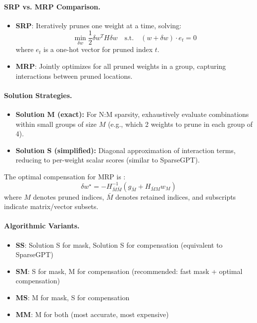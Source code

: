\paragraph{SRP vs. MRP Comparison.}
\begin{itemize}
	\item \textbf{SRP}: Iteratively prunes one weight at a time, solving:
	\begin{equation}\label{eq:srp}
		\min_{\delta w} \frac{1}{2}\delta w^T H \delta w \quad\text{s.t.}\quad (w+\delta w)\cdot e_t = 0
	\end{equation}
	where $e_t$ is a one-hot vector for pruned index $t$.
	
	\item \textbf{MRP}: Jointly optimizes for all pruned weights in a group, capturing interactions between pruned locations.
\end{itemize}

\paragraph{Solution Strategies.}
\begin{itemize}
	\item \textbf{Solution M (exact):} For N:M sparsity, exhaustively evaluate combinations within small groups of size $M$ (e.g., which 2 weights to prune in each group of 4).
	\item \textbf{Solution S (simplified):} Diagonal approximation of interaction terms, reducing to per-weight scalar scores (similar to SparseGPT).
\end{itemize}

The optimal compensation for MRP is \cite{zhao2024pruning}:
\begin{equation}
	\delta w^\star = -H_{\bar{M}\bar{M}}^{-1}(g_{\bar{M}} + H_{\bar{M}M}w_M)
\end{equation}
where $M$ denotes pruned indices, $\bar{M}$ denotes retained indices, and subscripts indicate matrix/vector subsets.

\paragraph{Algorithmic Variants.}
\begin{itemize}[nosep]
	\item \textbf{SS}: Solution S for mask, Solution S for compensation (equivalent to SparseGPT)
	\item \textbf{SM}: S for mask, M for compensation (recommended: fast mask + optimal compensation)
	\item \textbf{MS}: M for mask, S for compensation
	\item \textbf{MM}: M for both (most accurate, most expensive)
\end{itemize}

